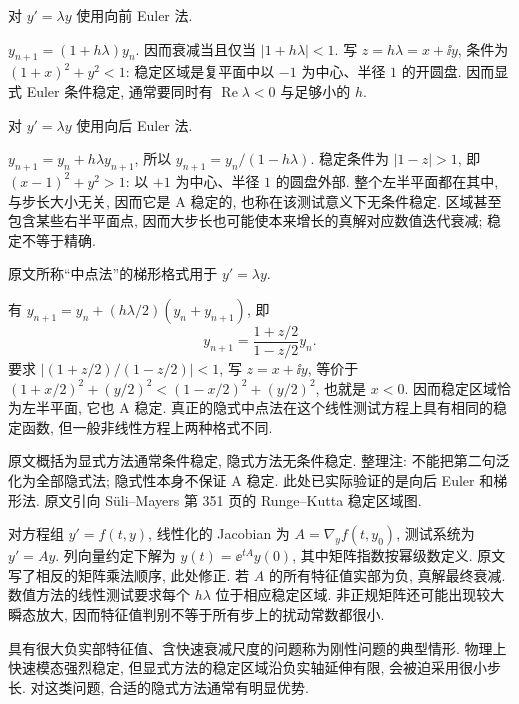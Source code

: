 \begin{example}\label{ex:euler-explicit-stability}
对 $y'=\lambda y$ 使用向前 Euler 法.
\end{example}
\begin{solution}
$y_{n+1}=(1+h\lambda)y_n$. 因而衰减当且仅当 $|1+h\lambda|<1$. 写 $z=h\lambda=x+\ii y$, 条件为 $(1+x)^2+y^2<1$: 稳定区域是复平面中以 $-1$ 为中心、半径 $1$ 的开圆盘. 因而显式 Euler 条件稳定, 通常要同时有 $\operatorname{Re}\lambda<0$ 与足够小的 $h$.
\end{solution}

\begin{example}\label{ex:euler-implicit-stability}
对 $y'=\lambda y$ 使用向后 Euler 法.
\end{example}
\begin{solution}
$y_{n+1}=y_n+h\lambda y_{n+1}$, 所以 $y_{n+1}=y_n/(1-h\lambda)$. 稳定条件为 $|1-z|>1$, 即 $(x-1)^2+y^2>1$: 以 $+1$ 为中心、半径 $1$ 的圆盘外部. 整个左半平面都在其中, 与步长大小无关, 因而它是 A 稳定的, 也称在该测试意义下无条件稳定. 区域甚至包含某些右半平面点, 因而大步长也可能使本来增长的真解对应数值迭代衰减; 稳定不等于精确.
\end{solution}

\begin{example}\label{ex:trapezoid-stability}
原文所称“中点法”的梯形格式用于 $y'=\lambda y$.
\end{example}
\begin{solution}
有 $y_{n+1}=y_n+(h\lambda/2)(y_n+y_{n+1})$, 即
\[
y_{n+1}=\frac{1+z/2}{1-z/2}y_n.
\]
要求 $|(1+z/2)/(1-z/2)|<1$, 写 $z=x+\ii y$, 等价于
$(1+x/2)^2+(y/2)^2<(1-x/2)^2+(y/2)^2$, 也就是 $x<0$. 因而稳定区域恰为左半平面, 它也 A 稳定. 真正的隐式中点法在这个线性测试方程上具有相同的稳定函数, 但一般非线性方程上两种格式不同.
\end{solution}

原文概括为显式方法通常条件稳定, 隐式方法无条件稳定. 整理注: 不能把第二句泛化为全部隐式法; 隐式性本身不保证 A 稳定. 此处已实际验证的是向后 Euler 和梯形法. 原文引向 Süli--Mayers 第 351 页的 Runge--Kutta 稳定区域图.

对方程组 $y'=f(t,y)$, 线性化的 Jacobian 为 $A=\nabla_yf(t,y_0)$, 测试系统为 $y'=Ay$. 列向量约定下解为 $y(t)=\ee^{tA}y(0)$, 其中矩阵指数按幂级数定义. 原文写了相反的矩阵乘法顺序, 此处修正. 若 $A$ 的所有特征值实部为负, 真解最终衰减. 数值方法的线性测试要求每个 $h\lambda$ 位于相应稳定区域. 非正规矩阵还可能出现较大瞬态放大, 因而特征值判别不等于所有步上的扰动常数都很小.

具有很大负实部特征值、含快速衰减尺度的问题称为刚性问题的典型情形. 物理上快速模态强烈稳定, 但显式方法的稳定区域沿负实轴延伸有限, 会被迫采用很小步长. 对这类问题, 合适的隐式方法通常有明显优势.

